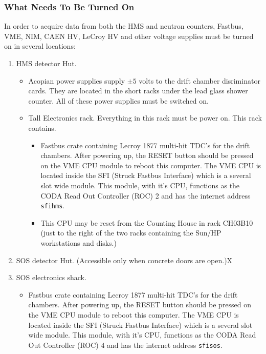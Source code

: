\subsubsection{What Needs To Be Turned On}
In order to acquire data from both the HMS and neutron counters, Fastbus,
VME, NIM, CAEN HV, LeCroy HV and other voltage supplies must be turned on in
several
locations:
\begin{enumerate}
\item HMS detector Hut.
 \begin{itemize}
   \item Acopian power supplies supply $\pm5$ volts to the drift chamber
disriminator cards.  They are located in the short racks under the lead
glass shower counter.  All of these power supplies must be switched
on.
   \item Tall Electronics rack.  Everything in this rack must be power on.
This rack contains.
   \begin{itemize}
    \item Fastbus crate containing Lecroy 1877 multi-hit TDC's for the drift
       chambers.  After powering up, the RESET button should be pressed on the
       VME CPU module to reboot this computer.  The VME CPU is located inside the
       SFI (Struck Fastbus Interface) which is a several slot wide module.
       This module, with it's CPU, functions as the CODA
       Read Out Controller (ROC) 2 and has the internet address \verb|sfihms|.

    \item This CPU may be reset from the Counting House in rack CH03B10
       (just to the right of the two racks containing the Sun/HP workstations
       and disks.)
   \end{itemize}
 \end{itemize}
\item SOS detector Hut.  (Accessible only when concrete doors are open.)X
\item SOS electronics shack.
\begin{itemize}
\item Fastbus crate containing Lecroy 1877 multi-hit TDC's for the drift
chambers.
After powering up, the RESET button should be pressed on the
VME CPU module to reboot this computer.  The VME CPU is located inside the
SFI (Struck Fastbus Interface) which is a several slot wide module.
This module, with it's CPU, functions as the CODA
Read Out Controller (ROC) 4 and has the internet address \verb|sfisos|.



\end{itemize}
\end{enumerate}

